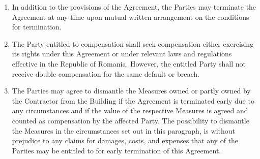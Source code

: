 \begin{multicols}{2}
\begin{enumerate}
	\item	In addition to the provisions of the Agreement, the Parties may terminate the Agreement at any time upon mutual written arrangement on the conditions for termination.
	\item	The Party entitled to compensation shall seek compensation either exercising its rights under this Agreement or under relevant laws and regulations effective in the Republic of Romania. However, the entitled Party shall not receive double compensation for the same default or breach.
	\item	The Parties may agree to dismantle the Measures owned or partly owned by the Contractor from the Building if the Agreement is terminated early due to any circumstances and if the value of the respective Measures is agreed and counted as compensation by the affected Party. The possibility to dismantle the Measures in the circumstances set out in this paragraph, is without prejudice to any claims for damages, costs, and expenses that any of the Parties may be entitled to for early termination of this Agreement.
\end{enumerate}


\end{multicols}
